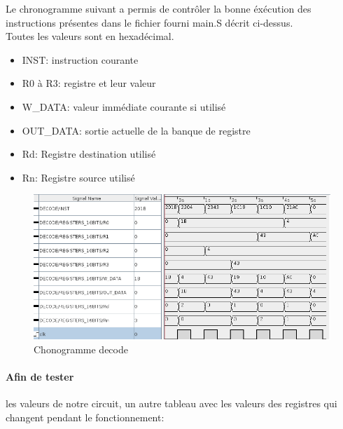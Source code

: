 \documentclass[a4paper]{article} %
\begin{document}
\pagebreak
Le chronogramme suivant a permis de contrôler la bonne éxécution des instructions présentes dans le fichier fourni main.S décrit ci-dessus.\\
Toutes les valeurs sont en hexadécimal.
\begin{itemize}
    \item     INST: instruction courante
    \item     R0 à R3: registre et leur valeur
    \item    W\_DATA: valeur immédiate courante si utilisé
    \item    OUT\_DATA: sortie actuelle de la banque de registre
    \item    Rd: Registre destination utilisé
    \item    Rn: Registre source utilisé
\end{itemize}

\begin{figure}[h]
    \centering
    \includegraphics[width=1.3\textwidth]{src/CHRONO_MAIN.png}
    \caption{Chonogramme decode}
    \label{chrono_decode}
\end{figure}
\pagebreak


\paragraph{Afin de tester} les valeurs de notre circuit, un autre tableau avec les valeurs des registres qui changent pendant le fonctionnement:\\
\end{document}
